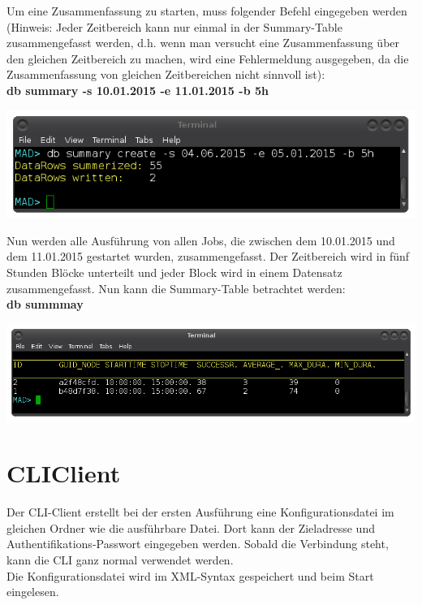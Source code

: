 \documentclass[12pt,a4paper]{report}
\begin{document}
\begin{onehalfspace}
Um eine Zusammenfassung zu starten, muss folgender Befehl eingegeben werden (Hinweis: Jeder Zeitbereich kann nur einmal in der Summary-Table zusammengefasst werden, d.h. wenn man versucht eine Zusammenfassung über den gleichen Zeitbereich zu machen, wird eine Fehlermeldung ausgegeben, da die Zusammenfassung von gleichen Zeitbereichen nicht sinnvoll ist):\\

\textbf{db summary -s 10.01.2015 -e 11.01.2015 -b 5h}

\begin{center}
\includegraphics[scale=0.5]{img/db_summary_create.png}
\end{center}

Nun werden alle Ausführung von allen Jobs, die zwischen dem 10.01.2015 und dem 11.01.2015 gestartet wurden, zusammengefasst. Der Zeitbereich wird in fünf Stunden Blöcke unterteilt und jeder Block wird in einem Datensatz zusammengefasst. Nun kann die Summary-Table betrachtet werden:\\

\textbf{db summmay}

\begin{center}
\includegraphics[scale=0.5]{img/db_summary.png}
\end{center}

\chapter{CLIClient}

Der CLI-Client erstellt bei der ersten Ausführung eine Konfigurationsdatei im gleichen Ordner wie die ausführbare Datei. Dort kann der Zieladresse und Authentifikations-Passwort eingegeben werden. Sobald die Verbindung steht, kann die CLI ganz normal verwendet werden.\\
Die Konfigurationsdatei wird im XML-Syntax gespeichert und beim Start eingelesen.


\end{onehalfspace}
\end{document}
